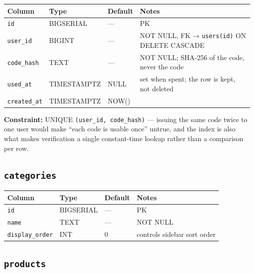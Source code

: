 \documentclass[12pt,a4paper,twoside]{report}
\newcommand{\code}[1]{\texttt{#1}}
\begin{document}
\begin{table}[H]
  \centering\small
  \begin{tabular}{@{}llll@{}}
    \toprule
    \textbf{Column} & \textbf{Type} & \textbf{Default} & \textbf{Notes} \\
    \midrule
    \code{id}         & BIGSERIAL   & ---   & PK \\
    \code{user\_id}   & BIGINT      & ---   & NOT NULL, FK → \code{users(id)} ON DELETE CASCADE \\
    \code{code\_hash} & TEXT        & ---   & NOT NULL; SHA-256 of the code, never the code \\
    \code{used\_at}   & TIMESTAMPTZ & NULL  & set when spent; the row is kept, not deleted \\
    \code{created\_at}& TIMESTAMPTZ & NOW() & \\
    \bottomrule
  \end{tabular}
\end{table}

\noindent\textbf{Constraint:} UNIQUE \code{(user\_id, code\_hash)} — issuing the
same code twice to one user would make ``each code is usable once'' untrue, and
the index is also what makes verification a single constant-time lookup rather
than a comparison per row.

\subsection*{\texttt{categories}}

\begin{table}[H]
  \centering\small
  \begin{tabular}{@{}llll@{}}
    \toprule
    \textbf{Column} & \textbf{Type} & \textbf{Default} & \textbf{Notes} \\
    \midrule
    \code{id}            & BIGSERIAL & --- & PK \\
    \code{name}          & TEXT      & --- & NOT NULL \\
    \code{display\_order}& INT       & 0   & controls sidebar sort order \\
    \bottomrule
  \end{tabular}
\end{table}

\subsection*{\texttt{products}}
\end{document}
